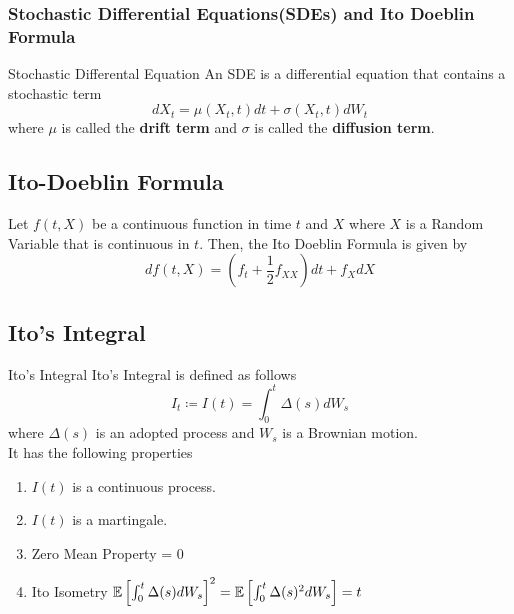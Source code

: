 \begin{frame}
	\frametitle{Stochastic Differential Equations(SDEs) and
	Ito Doeblin Formula}
	\begin{block}{Stochastic Differental Equation}
		An SDE is a differential equation that contains a stochastic term
		\[ dX_t = \mu(X_t, t)dt + \sigma(X_t, t)dW_t \]
		where \( \mu \) is called the \textbf{drift term} and
		\( \sigma \) is called the \textbf{diffusion term}.
	\end{block}

	\subsection{Ito-Doeblin Formula}
	\begin{theorem} \label{thm:ito-doeblin-formula}
		Let \( f(t, X) \) be a continuous function in time \( t \) and \( X \)
		where \( X \) is a Random Variable that is continuous in \( t \).
		Then, the Ito Doeblin Formula is given by
		\[ df(t, X) = \left( f_t + \frac{1}{2}f_{XX} \right) dt + f_{X} dX \]
	\end{theorem}
\end{frame}

\subsection{Ito's Integral}
\begin{frame}{Ito's Integral}
	Ito's Integral is defined as follows
	\[ I_t \coloneqq I(t) = \int_0^t \Delta(s) dW_s \]
	where \( \Delta(s) \) is an adopted process and \( W_s \) is a Brownian
	motion. \\

	It has the following properties
	\begin{enumerate}
		\item \( I(t) \) is a continuous process.
		\item \( I(t) \) is a martingale.
		\item Zero Mean Property  = 0
		\item Ito Isometry \( \mathbb{E} \left[ \int_0^t \Delta(s) dW_s \right]^2
			= \mathbb{E} \left[ \int_0^t \Delta(s)^2 dW_s \right] = t \)
	\end{enumerate}

\end{frame}
